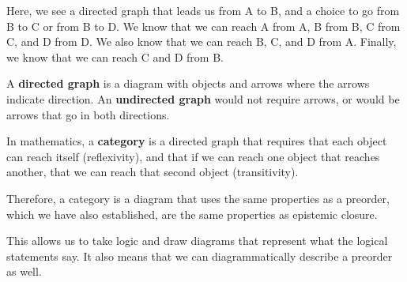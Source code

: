 

Here, we see a directed graph that leads us from A to B, and a choice to go from B to C or from B to D. We know that we can reach A from A, B from B, C from C, and D from D. We also know that we can reach B, C, and D from A. Finally, we know that we can reach C and D from B.

\begin{definition}
    A \textbf{directed graph} is a diagram with objects and arrows where the arrows indicate direction. An \textbf{undirected graph} would not require arrows, or would be arrows that go in both directions.
\end{definition}

\begin{definition}
    In mathematics, a \textbf{category} is a directed graph that requires that each object can reach itself (reflexivity), and that if we can reach one object that reaches another, that we can reach that second object (transitivity).
\end{definition}

Therefore, a category is a diagram that uses the same properties as a preorder, which we have also established, are the same properties as epistemic closure.

This allows us to take logic and draw diagrams that represent what the logical statements say. It also means that we can diagrammatically describe a preorder as well.

